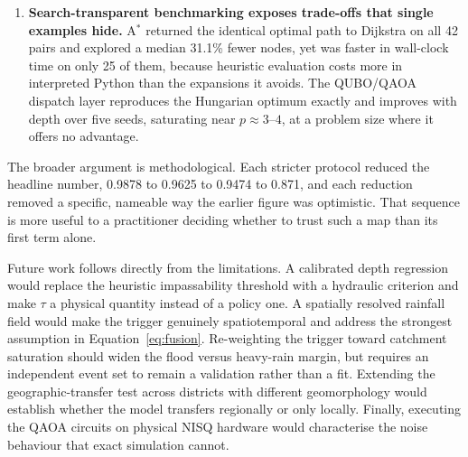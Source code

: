 \documentclass[10pt,twocolumn]{article}
\begin{document}
\begin{enumerate}
      pairs at $\tau\ge0.65$, $0.55$--$0.60$ and $\le0.50$. $\tau$ should be set
      by policy on acceptable risk, not by convention.
\item \textbf{Search-transparent benchmarking exposes trade-offs that single
      examples hide.} A$^\ast$ returned the identical optimal path to Dijkstra on
      all 42 pairs and explored a median 31.1\% fewer nodes, yet was faster in
      wall-clock time on only 25 of them, because heuristic evaluation costs more
      in interpreted Python than the expansions it avoids. The QUBO/QAOA dispatch
      layer reproduces the Hungarian optimum exactly and improves with depth
      over five seeds, saturating near $p\approx3$--$4$, at a problem size where
      it offers no advantage.
\end{enumerate}

The broader argument is methodological. Each stricter protocol reduced the
headline number, 0.9878 to 0.9625 to 0.9474 to 0.871, and each reduction removed
a specific, nameable way the earlier figure was optimistic. That sequence is more
useful to a practitioner deciding whether to trust such a map than its first term
alone.

Future work follows directly from the limitations. A calibrated depth regression
would replace the heuristic impassability threshold with a hydraulic criterion
and make $\tau$ a physical quantity instead of a policy one. A spatially
resolved rainfall field would make the trigger genuinely spatiotemporal and
address the strongest assumption in Equation~\eqref{eq:fusion}. Re-weighting the
trigger toward catchment saturation should widen the flood versus heavy-rain
margin, but requires an independent event set to remain a validation rather than
a fit. Extending the geographic-transfer test across districts with different
geomorphology would establish whether the model transfers regionally or only
locally. Finally, executing the QAOA circuits on physical NISQ hardware would
characterise the noise behaviour that exact simulation cannot.


\footnotesize
\end{document}
